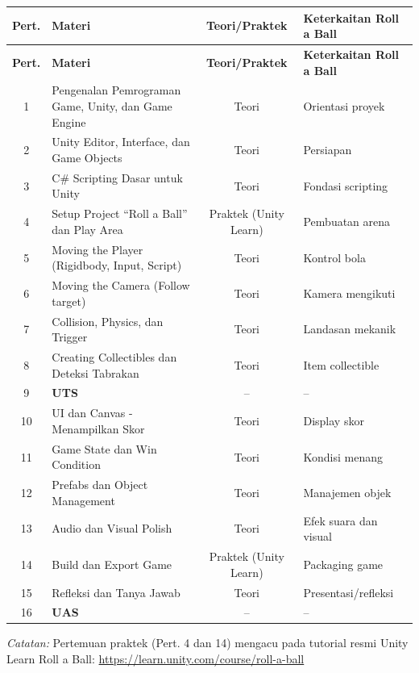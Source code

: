 \documentclass[12pt,a4paper]{article}
\begin{document}
\begin{longtable}{|c|>{\raggedright\arraybackslash}p{5.5cm}|c|>{\raggedright\arraybackslash}p{4cm}|}
\hline
\textbf{Pert.} & \textbf{Materi} & \textbf{Teori/Praktek} & \textbf{Keterkaitan Roll a Ball} \\
\hline
\endfirsthead
\hline
\textbf{Pert.} & \textbf{Materi} & \textbf{Teori/Praktek} & \textbf{Keterkaitan Roll a Ball} \\
\hline
\endhead
1 & Pengenalan Pemrograman Game, Unity, dan Game Engine & Teori & Orientasi proyek \\
2 & Unity Editor, Interface, dan Game Objects & Teori & Persiapan \\
3 & C\# Scripting Dasar untuk Unity & Teori & Fondasi scripting \\
4 & Setup Project ``Roll a Ball'' dan Play Area & Praktek (Unity Learn) & Pembuatan arena \\
5 & Moving the Player (Rigidbody, Input, Script) & Teori & Kontrol bola \\
6 & Moving the Camera (Follow target) & Teori & Kamera mengikuti \\
7 & Collision, Physics, dan Trigger & Teori & Landasan mekanik \\
8 & Creating Collectibles dan Deteksi Tabrakan & Teori & Item collectible \\
9 & \textbf{UTS} & -- & -- \\
10 & UI dan Canvas - Menampilkan Skor & Teori & Display skor \\
11 & Game State dan Win Condition & Teori & Kondisi menang \\
12 & Prefabs dan Object Management & Teori & Manajemen objek \\
13 & Audio dan Visual Polish & Teori & Efek suara dan visual \\
14 & Build dan Export Game & Praktek (Unity Learn) & Packaging game \\
15 & Refleksi dan Tanya Jawab & Teori & Presentasi/refleksi \\
16 & \textbf{UAS} & -- & -- \\
\hline
\end{longtable}

\textit{Catatan:} Pertemuan praktek (Pert. 4 dan 14) mengacu pada tutorial resmi Unity Learn Roll a Ball: \url{https://learn.unity.com/course/roll-a-ball}

\vspace{0.5cm}

\end{document}
